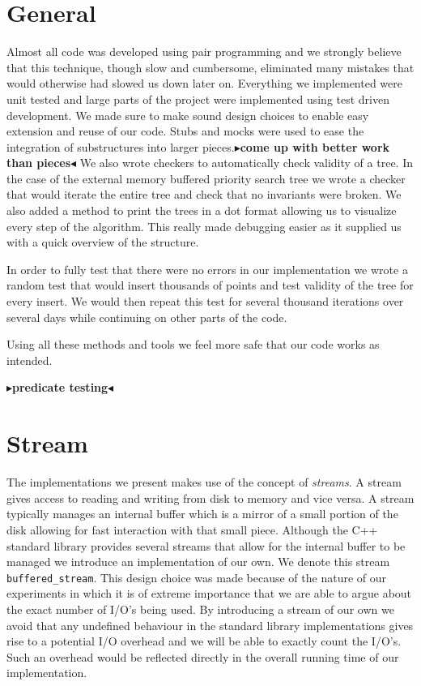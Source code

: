 \documentclass[twoside,11pt,openright]{report}
\newcommand{\todo}[1]{{\color[rgb]{.5,0,0}\textbf{$\blacktriangleright$#1$\blacktriangleleft$}}}
\begin{document}
\section{General}
Almost all code was developed using pair programming and we strongly believe that this technique, though slow and cumbersome, eliminated many mistakes that would otherwise had slowed us down later on.
Everything we implemented were unit tested and large parts of the project were implemented using test driven development. We made sure to make sound design choices to enable easy extension and reuse of our code. Stubs and mocks were used to ease the integration of substructures into larger pieces.\todo{come up with better work than pieces}
We also wrote checkers to automatically check validity of a tree. In the case of the external memory buffered priority search tree we wrote a checker that would iterate the entire tree and check that no invariants were broken. We also added a method to print the trees in a dot format allowing us to visualize every step of the algorithm. This really made debugging easier as it supplied us with a quick overview of the structure.

In order to fully test that there were no errors in our implementation we wrote a random test that would insert thousands of points and test validity of the tree for every insert. We would then repeat this test for several thousand iterations over several days while continuing on other parts of the code.

Using all these methods and tools we feel more safe that our code works as intended.

\todo{predicate testing}

\section{Stream}
The implementations we present makes use of the concept of \textit{streams}. A stream gives access to reading and writing from disk to memory and vice versa. A stream typically manages an internal buffer which is a mirror of a small portion of the disk allowing for fast interaction with that small piece. Although the C++ standard library provides several streams that allow for the internal buffer to be managed we introduce an implementation of our own. We denote this stream \texttt{buffered\_stream}. This design choice was made because of the nature of our experiments in which it is of extreme importance that we are able to argue about the exact number of I/O's being used. By introducing a stream of our own we avoid that any undefined behaviour in the standard library implementations gives rise to a potential I/O overhead and we will be able to exactly count the I/O's. Such an overhead would be reflected directly in the overall running time of our implementation.
\end{document}
